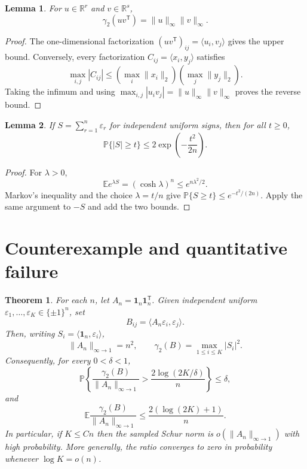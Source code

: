 \documentclass[11pt]{article}
\newtheorem{theorem}{Theorem}
\newtheorem{lemma}{Lemma}
\newcommand{\R}{\mathbb R}
\newcommand{\E}{\mathbb E}
\newcommand{\PP}{\mathbb P}
\newcommand{\one}{\mathbf 1}
\newcommand{\gamtwo}{\gamma_2}
\begin{document}
\begin{lemma}\label{lem:rankone}
For $u\in\R^r$ and $v\in\R^s$,
\[
 \gamtwo(uv^{\mathsf T})=\|u\|_\infty\|v\|_\infty.
\]
\end{lemma}

\begin{proof}
The one-dimensional factorization
$(uv^{\mathsf T})_{ij}=\langle u_i,v_j\rangle$ gives the upper bound.
Conversely, every factorization $C_{ij}=\langle x_i,y_j\rangle$ satisfies
\[
 \max_{i,j}|C_{ij}|
 \leq(\max_i\|x_i\|_2)(\max_j\|y_j\|_2).
\]
Taking the infimum and using
$\max_{i,j}|u_iv_j|=\|u\|_\infty\|v\|_\infty$ proves the reverse bound.
\end{proof}

\begin{lemma}\label{lem:tail}
If $S=\sum_{r=1}^n\varepsilon_r$ for independent uniform signs, then for
all $t\geq0$,
\[
 \PP\{|S|\geq t\}\leq2\exp\!\left(-\frac{t^2}{2n}\right).
\]
\end{lemma}

\begin{proof}
For $\lambda>0$,
\[
 \E e^{\lambda S}=(\cosh\lambda)^n
 \leq e^{n\lambda^2/2}.
\]
Markov's inequality and the choice $\lambda=t/n$ give
$\PP\{S\geq t\}\leq e^{-t^2/(2n)}$.  Apply the same argument to $-S$ and
add the two bounds.
\end{proof}

\section{Counterexample and quantitative failure}

\begin{theorem}\label{thm:main}
For each $n$, let $A_n=\one_n\one_n^{\mathsf T}$.  Given independent uniform
$\varepsilon_1,\ldots,\varepsilon_K\in\{\pm1\}^n$, set
\[
 B_{ij}=\langle A_n\varepsilon_i,\varepsilon_j\rangle.
\]
Then, writing $S_i=\langle\one_n,\varepsilon_i\rangle$,
\[
 \|A_n\|_{\infty\to1}=n^2,
 \qquad
 \gamtwo(B)=\max_{1\leq i\leq K}|S_i|^2.
\]
Consequently, for every $0<\delta<1$,
\begin{equation}\label{eq:hp}
 \PP\left\{
 \frac{\gamtwo(B)}{\|A_n\|_{\infty\to1}}
 >\frac{2\log(2K/\delta)}{n}
 \right\}\leq\delta,
\end{equation}
and
\begin{equation}\label{eq:mean}
 \E\frac{\gamtwo(B)}{\|A_n\|_{\infty\to1}}
 \leq\frac{2(\log(2K)+1)}{n}.
\end{equation}
In particular, if $K\leq Cn$ then the sampled Schur norm is
$o(\|A_n\|_{\infty\to1})$ with high probability.  More generally, the
ratio converges to zero in probability whenever $\log K=o(n)$.
\end{theorem}
\end{document}
